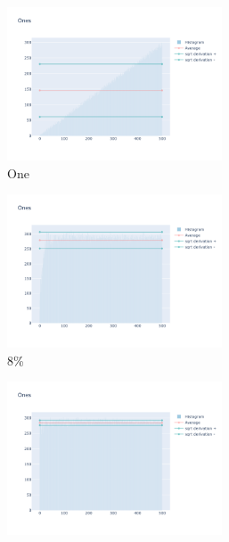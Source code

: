 \documentclass[12pt, fleqn]{report}                             %
\theoremstyle{break}                                            %
\begin{document}
        \begin{figure}[h!]
          \centering
          \begin{subfigure}[b]{0.4\linewidth}
            \includegraphics[width=0.7\textwidth]{Images/110/dia-a.png}
            \caption{One}
          \end{subfigure}
          \begin{subfigure}[b]{0.4\linewidth}
            \includegraphics[width=0.7\textwidth]{Images/110/dia-b.png}
            \caption{8\%}
          \end{subfigure}
          \begin{subfigure}[b]{0.4\linewidth}
            \includegraphics[width=0.7\textwidth]{Images/110/dia-c.png}

\end{subfigure}
\end{figure}
\end{document}
